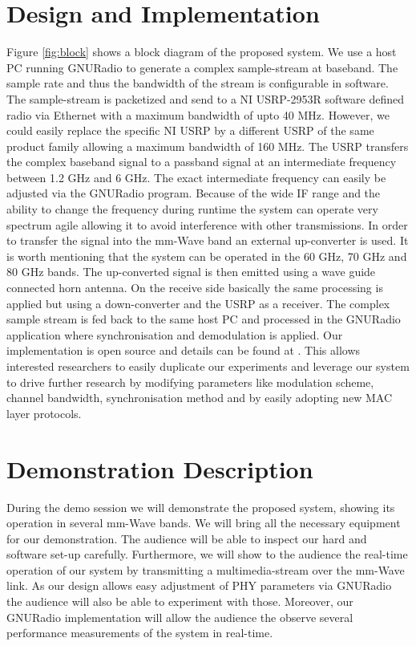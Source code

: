 \documentclass{acm_proc_article-sp}
\begin{document}
\section{Design and Implementation}
Figure \ref{fig:block} shows a block diagram of the proposed system. 
We use a host PC running GNURadio \cite{gnuradio} to generate a complex sample-stream at baseband. The sample rate and thus the bandwidth of the stream is configurable in software. The sample-stream is packetized and send to a NI USRP-2953R \cite{ettus} software defined radio via Ethernet with a maximum bandwidth of upto 40 MHz. However, we could easily replace the specific NI USRP by a different USRP of the same product family allowing a maximum bandwidth of 160 MHz.
The USRP transfers the complex baseband signal to a passband signal at an intermediate frequency between 1.2 GHz and 6 GHz. The exact intermediate frequency can easily be adjusted via the GNURadio program. Because of the wide IF range and the ability to change the frequency during runtime the system can operate very spectrum agile allowing it to avoid interference with other transmissions.
In order to transfer the signal into the mm-Wave band an external up-converter is used. It is worth mentioning that the system can be operated in the 60 GHz, 70 GHz and 80 GHz bands.
The up-converted signal is then emitted using a wave guide connected horn antenna.
On the receive side basically the same processing is applied but using a down-converter and the USRP as a receiver. The complex sample stream is fed back to the same host PC and processed in the GNURadio application where synchronisation and demodulation is applied.
Our implementation is open source and details can be found at \cite{gr-inets}. This allows interested researchers to easily duplicate our experiments and leverage our system to drive further research by modifying parameters like modulation scheme, channel bandwidth, synchronisation method and by easily adopting new MAC layer protocols.

\section{Demonstration Description} 
During the demo session we will demonstrate the proposed system, showing its operation in several mm-Wave bands. We will bring all the necessary equipment for our demonstration. The audience will be able to inspect our hard and software set-up carefully. Furthermore, we will show to the audience the real-time operation of our system by transmitting a multimedia-stream over the mm-Wave link. As our design allows easy adjustment of PHY parameters via GNURadio the audience will also be able to experiment with those. Moreover, our GNURadio implementation will allow the audience the observe several performance measurements of the system in real-time.
\end{document}
